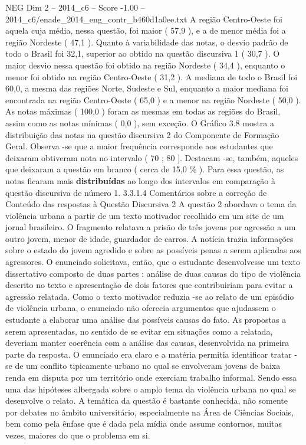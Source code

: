 \begin{textsample}{NEG Dim 2 – 2014\_c6 – Score -1.00 – 2014\_c6/enade\_2014\_eng\_contr\_b460d1a0ee.txt}
A região Centro-Oeste foi aquela cuja média, nessa questão, foi maior ( 57,9 ), e a de menor média foi a região Nordeste ( 47,1 ).
Quanto à variabilidade das notas, o desvio padrão de todo o Brasil foi 32,1, superior ao obtido na questão discursiva 1 ( 30,7 ).
O maior desvio nessa questão foi obtido na região Nordeste ( 34,4 ), enquanto o menor foi obtido na região Centro-Oeste ( 31,2 ).
A mediana de todo o Brasil foi 60,0, a mesma das regiões Norte, Sudeste e Sul, enquanto a maior mediana foi encontrada na região Centro-Oeste ( 65,0 ) e a menor na região Nordeste ( 50,0 ).
As notas máximas ( 100,0 ) foram as mesmas em todas as regiões do Brasil, assim como as notas mínimas ( 0,0 ), sem exceção.
O Gráfico 3.8 mostra a distribuição das notas na questão discursiva 2 do Componente de Formação Geral.
Observa -se que a maior frequência corresponde aos estudantes que deixaram obtiveram nota no intervalo ( 70 ; 80 ].
Destacam -se, também, aqueles que deixaram a questão em branco ( cerca de 15,0 \% ).
Para essa questão, as notas ficaram mais \textbf{distribuídas} ao longo dos intervalos em comparação à questão discursiva de número 1. 3.3.1.4 Comentários sobre a correção de Conteúdo das respostas à Questão Discursiva 2 A questão 2 abordava o tema da violência urbana a partir de um texto motivador recolhido em um site de um jornal brasileiro.
O fragmento relatava a prisão de três jovens por agressão a um outro jovem, menor de idade, guardador de carros.
A notícia trazia informações sobre o estado do jovem agredido e sobre as possíveis penas a serem aplicadas aos agressores.
O enunciado solicitava, então, que o estudante desenvolvesse um texto dissertativo composto de duas partes : análise de duas causas do tipo de violência descrito no texto e apresentação de dois fatores que contribuiriam para evitar a agressão relatada.
Como o texto motivador reduzia -se ao relato de um episódio de violência urbana, o enunciado não oferecia argumentos que ajudassem o estudante a elaborar uma análise das possíveis causas do fato.
As propostas a serem apresentadas, no sentido de se evitar em situações como a relatada, deveriam manter coerência com a análise das causas, desenvolvida na primeira parte da resposta.
O enunciado era claro e a matéria permitia identificar tratar -se de um conflito tipicamente urbano no qual se envolveram jovens de baixa renda em disputa por um território onde exerciam trabalho informal.
Sendo essa uma das hipóteses albergada sobre o amplo tema da violência urbana no qual se desenvolve o relato.
A temática da questão é bastante conhecida, não somente por debates no âmbito universitário, especialmente na Área de Ciências Sociais, bem como pela ênfase que é dada pela mídia onde assume contornos, muitas vezes, maiores do que o problema em si.

\end{textsample}

